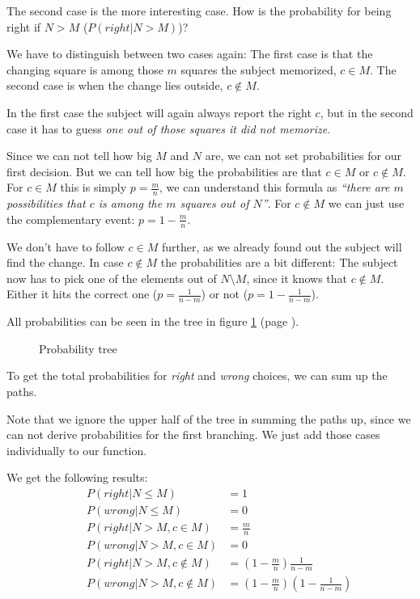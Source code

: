 The second case is the more interesting case. How is the probability for being 
right if $N > M$ ($P(right | N > M)$)?

We have to distinguish between two cases again: The first case is that the 
changing square is among those $m$ squares the subject memorized, $c \in M$. 
The second case is when the change lies outside, $c \notin M$.

In the first case the subject will again always report the right $c$, but in the
second case it has to guess \textit{one out of those squares it did not memorize}.

Since we can not tell how big $M$ and $N$ are, we can not set probabilities for 
our first decision. But we can tell how big the probabilities are that $c \in M$ 
or $c \notin M$. For $c \in M$ this is simply $p = \frac{m}{n}$, we can understand 
this formula as \textit{``there are $m$ possibilities that $c$ is among the $m$ 
squares out of $N$''}. For $c \notin M$ we can just use the complementary event:
$p = 1 - \frac{m}{n}$.

We don't have to follow $c \in M$ further, as we already found out the subject 
will find the change. In case $c \notin M$ the probabilities are a bit different: 
The subject now has to pick one of the elements out of $N \setminus M$, since it 
knows that $c \notin M$. Either it hits the correct one ($p = \frac{1}{n - m}$)
or not ($p = 1 - \frac{1}{n - m}$).

All probabilities can be seen in the tree in figure \ref{tree} (page \pageref{tree}).

\begin{figure}
  
  \caption{Probability tree}
  \label{tree}
\end{figure}

To get the total probabilities for \textit{right} and \textit{wrong} choices, we 
can sum up the paths.

Note that we ignore the upper half of the tree in summing the paths up, since we 
can not derive probabilities for the first branching. We just add those cases 
individually to our function.

We get the following results:
\begin{align*}
&&P(right | N \leq M) &= 1 \\
&&P(wrong | N \leq M) &= 0 \\
&&P(right | N > M, c \in M) &= \frac{m}{n} \\
&&P(wrong | N > M, c \in M) &= 0 \\
&&P(right | N > M, c \notin M) &= \left(1 - \frac{m}{n}\right) \frac{1}{n-m} \\
&&P(wrong | N > M, c \notin M) &= \left(1 - \frac{m}{n}\right) \left(1 - \frac{1}{n-m}\right)
\end{align*}

